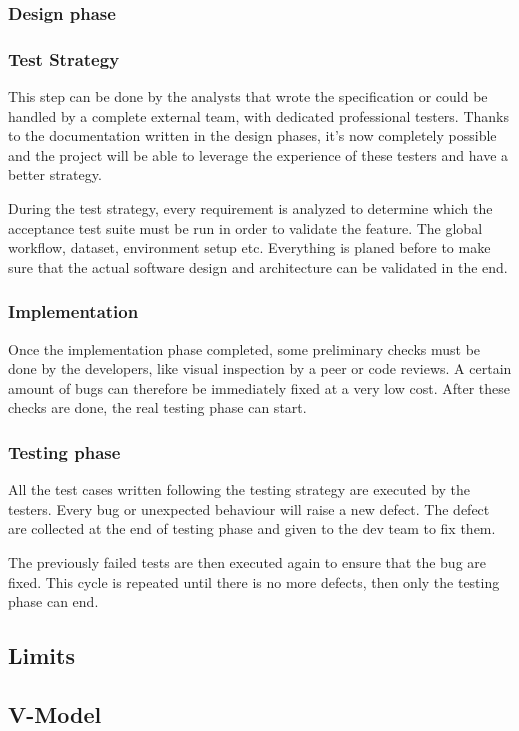 \subsubsection{Design phase}

\subsubsection{Test Strategy}
This step can be done by the analysts that wrote the specification or could be
handled by a complete external team, with dedicated professional testers.
Thanks to the documentation written in the design phases, it's now completely
possible and the project will be able to leverage the experience of these
testers and have a better strategy.

During the test strategy, every requirement is analyzed to determine which
the acceptance test suite must be run in order to validate the feature.
The global workflow, dataset, environment setup etc.
Everything is planed before to make sure that the actual software design and
architecture can be validated in the end.

\subsubsection{Implementation}
Once the implementation phase completed, some
preliminary checks must be done by the developers, like visual inspection
by a peer or code reviews.
A certain amount of bugs can therefore be immediately fixed at a very low cost.
After these checks are done, the real testing phase can start.

\subsubsection{Testing phase}
All the test cases written following the testing strategy are executed by the
testers.
Every bug or unexpected behaviour will raise a new defect.
The defect are collected at the end of testing phase and given to the dev
team to fix them.

The previously failed tests are then executed again to ensure that the bug
are fixed.
This cycle is repeated until there is no more defects, then only the testing
phase can end.

\subsection{Limits}\label{subsec:limits}

\subsection{V-Model}\label{subsec:v-model}